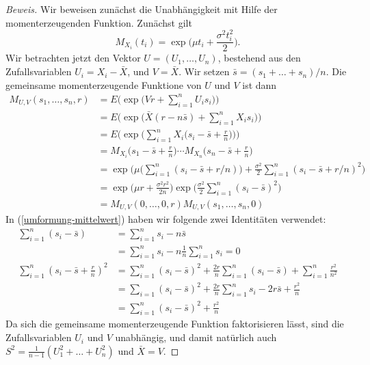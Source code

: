 \begin{proof}[Beweis]
Wir beweisen zunächst die Unabhängigkeit mit Hilfe der momenterzeugenden
Funktion.
Zunächst gilt
\begin{equation}
M_{X_i}(t_i)=\exp\biggl(\mu t_i+\frac{\sigma^2t_i^2}2\biggr).
\end{equation}
Wir betrachten jetzt den Vektor $U=(U_1,\dots,U_n)$, bestehend aus
den Zufallsvariablen $U_i=X_i-\bar X$, und $V=\bar X$.
Wir setzen $\bar s=(s_1+\dots +s_n)/n$.
Die gemeinsame momenterzeugende Funktione
von $U$ und $V$ ist dann
\begin{align}
M_{U,V}(s_1,\dots,s_n,r)
&=
E\biggl(\exp\biggl(Vr+\sum_{i=1}^nU_is_i\biggr)\biggr)
\nonumber\\
&=
E\biggl(\exp\biggl(\bar X(r-n\bar s)+\sum_{i=1}^nX_is_i\biggr)\biggr)
\nonumber\\
&=
E\biggl(\exp\biggl(\sum_{i=1}^nX_i\bigl(s_i-\bar s+\frac{r}{n}\bigr)\biggr)\biggr)
\nonumber\\
&=
M_{X_i}\biggl(s_1-\bar s+\frac{r}{n}\biggr)\cdots
M_{X_n}\biggl(s_n-\bar s+\frac{r}{n}\biggr)
\nonumber\\
&=
\exp\biggl(
\mu\biggl(\sum_{i=1}^n(s_i-\bar s+r/n)\biggr)+\frac{\sigma^2}2\sum_{i=1}^n(s_i-\bar s+r/n)^2
\biggr)
\nonumber\\
&=
\exp\biggl(\mu r+\frac{\sigma^2r^2}{2n}\biggr)
\exp\biggl(\frac{\sigma^2}{2}\sum_{i=1}^n(s_i-\bar s)^2\biggr)\label{umformung-mittelwert}
\\
&=
M_{U,V}(0,\dots,0,r)M_{U,V}(s_1,\dots,s_n,0)
\nonumber
\end{align}
In (\ref{umformung-mittelwert}) haben wir folgende zwei Identitäten verwendet:
\begin{align}
\sum_{i=1}^n(s_i-\bar s)
&=
\sum_{i=1}^ns_i-n\bar s
\nonumber\\
&=
\sum_{i=1}^ns_i-n\frac1n\sum_{i=1}^ns_i=0 \label{si-mittelwert}
\\
\sum_{i=1}^n(s_i-\bar s+\frac{r}{n})^2
&=
\sum_{i=1}^n(s_i-\bar s)^2
+\frac{2r}{n}\sum_{i=1}^n(s_i-\bar s)
+\sum_{i=1}^n\frac{r^2}{n^2}
\nonumber\\
&=
\sum_{i=1}(s_i-\bar s)^2
+\frac{2r}{n}\sum_{i=1}^ns_i-2r\bar s
+\frac{r^2}{n}
\nonumber\\
&=
\sum_{i=1}^n(s_i-\bar s)^2+\frac{r^2}{n} \label{si-varianz}
\end{align}
Da sich die gemeinsame momenterzeugende Funktion faktorisieren
lässt, sind die Zufallsvariablen $U_i$ und $V$ unabhängig,
und damit natürlich auch $S^2=\frac1{n-1}(U_1^2+\dots+U_n^2)$ und
$\bar X=V$.


\end{proof}
